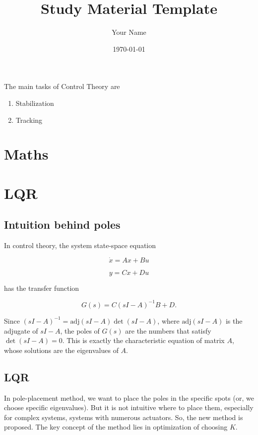 \documentclass{article}
\title{Study Material Template}
\author{Your Name}
\date{\today}
\begin{document}
\maketitle

\tableofcontents
\newpage


The main tasks of Control Theory are 

\begin{enumerate}
    \item Stabilization
    \item Tracking 
\end{enumerate}
\section{Maths}











\section{LQR}

\subsection{Intuition behind poles}
In control theory, the system state-space equation

\[\dot{x} = Ax+Bu\]

\[y=Cx+Du\]

has the transfer function

\[G(s)=C(sI-A)^{-1}B+D.\]

Since \((sI-A)^{-1}=\text{adj}(sI-A)\det(sI-A)\), where \(\text{adj}(sI-A)\) is the adjugate of \(sI-A\), the poles of \(G(s)\) are the numbers that satisfy \(\det(sI-A)=0\). This is exactly the characteristic equation of matrix \(A\), whose solutions are the eigenvalues of \(A\).

\subsection{LQR}
In pole-placement method, we want to place the poles in the specific spots (or, we choose specific eigenvalues). But it is not intuitive where to place them, especially for complex systems, systems with numerous actuators.
So, the new method is proposed. The key concept of the method lies in optimization of choosing \(K\). 
\end{document}
